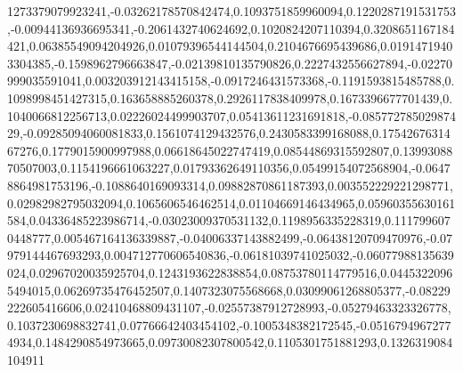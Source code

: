 1273379079923241,-0.03262178570842474,0.1093751859960094,0.1220287191531753,-0.00944136936695341,-0.2061432740624692,0.1020824207110394,0.3208651167184421,0.06385549094204926,0.01079396544144504,0.2104676695439686,0.01914719403304385,-0.1598962796663847,-0.02139810135790826,0.2227432556627894,-0.02270999035591041,0.003203912143415158,-0.0917246431573368,-0.1191593815485788,0.1098998451427315,0.163658885260378,0.2926117838409978,0.1673396677701439,0.1040066812256713,0.02226024499903707,0.05413611231691818,-0.08577278502987429,-0.09285094060081833,0.1561074129432576,0.2430583399168088,0.1754267631467276,0.1779015900997988,0.06618645022747419,0.08544869315592807,0.1399308870507003,0.1154196661063227,0.01793362649110356,0.05499154072568904,-0.06478864981753196,-0.1088640169093314,0.09882870861187393,0.003552229221298771,0.02982982795032094,0.1065606546462514,0.01104669146434965,0.05960355630161584,0.04336485223986714,-0.03023009370531132,0.1198956335228319,0.1117996070448777,0.005467164136339887,-0.04006337143882499,-0.06438120709470976,-0.07979144467693293,0.004712770606540836,-0.06181039741025032,-0.06077988135639024,0.02967020035925704,0.1243193622838854,0.08753780114779516,0.04453220965494015,0.06269735476452507,0.1407323075568668,0.03099061268805377,-0.08229222605416606,0.02410468809431107,-0.02557387912728993,-0.05279463323326778,0.1037230698832741,0.07766642403454102,-0.1005348382172545,-0.05167949672774934,0.1484290854973665,0.09730082307800542,0.1105301751881293,0.1326319084104911
